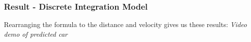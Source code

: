 \begin{frame}
\begin{figure}
\begin{minipage}[b]{0.49\linewidth}
    \end{minipage}
  \end{figure}
\end{frame}

\begin{frame}
  \frametitle{Result - Discrete Integration Model}
    Rearranging the formula to the distance and velocity gives us these results:
    \center \textit{Video demo of predicted car}
\end{frame}

